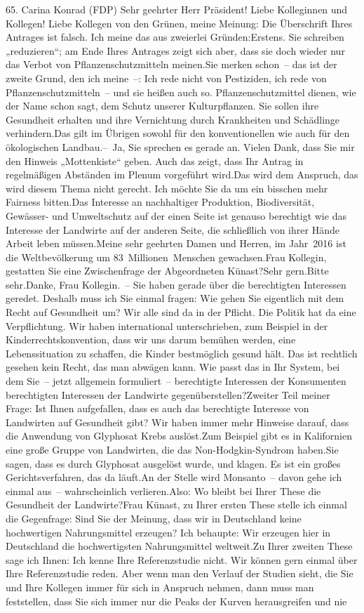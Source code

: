 \documentclass{article}
\begin{document}
	65. Carina Konrad (FDP) Sehr geehrter Herr Präsident! Liebe Kolleginnen und Kollegen! Liebe Kollegen von den Grünen, meine Meinung: Die Überschrift Ihres Antrages ist falsch. Ich meine das aus zweierlei Gründen:Erstens. Sie schreiben „reduzieren“; am Ende Ihres Antrages zeigt sich aber, dass sie doch wieder nur das Verbot von Pflanzenschutzmitteln meinen.Sie merken schon – das ist der zweite Grund, den ich meine –: Ich rede nicht von Pestiziden, ich rede von Pflanzenschutzmitteln – und sie heißen auch so. Pflanzenschutzmittel dienen, wie der Name schon sagt, dem Schutz unserer Kulturpflanzen. Sie sollen ihre Gesundheit erhalten und ihre Vernichtung durch Krankheiten und Schädlinge verhindern.Das gilt im Übrigen sowohl für den konventionellen wie auch für den ökologischen Landbau.– Ja, Sie sprechen es gerade an. Vielen Dank, dass Sie mir den Hinweis „Mottenkiste“ geben. Auch das zeigt, dass Ihr Antrag in regelmäßigen Abständen im Plenum vorgeführt wird.Das wird dem Anspruch, das wird diesem Thema nicht gerecht. Ich möchte Sie da um ein bisschen mehr Fairness bitten.Das Interesse an nachhaltiger Produktion, Biodiversität, Gewässer- und Umweltschutz auf der einen Seite ist genauso berechtigt wie das Interesse der Landwirte auf der anderen Seite, die schließlich von ihrer Hände Arbeit leben müssen.Meine sehr geehrten Damen und Herren, im Jahr 2016 ist die Weltbevölkerung um 83 Millionen Menschen gewachsen.Frau Kollegin, gestatten Sie eine Zwischenfrage der Abgeordneten Künast?Sehr gern.Bitte sehr.Danke, Frau Kollegin. – Sie haben gerade über die berechtigten Interessen geredet. Deshalb muss ich Sie einmal fragen: Wie gehen Sie eigentlich mit dem Recht auf Gesundheit um? Wir alle sind da in der Pflicht. Die Politik hat da eine Verpflichtung. Wir haben international unterschrieben, zum Beispiel in der Kinderrechtskonvention, dass wir uns darum bemühen werden, eine Lebenssituation zu schaffen, die Kinder bestmöglich gesund hält. Das ist rechtlich gesehen kein Recht, das man abwägen kann. Wie passt das in Ihr System, bei dem Sie – jetzt allgemein formuliert – berechtigte Interessen der Konsumenten berechtigten Interessen der Landwirte gegenüberstellen?Zweiter Teil meiner Frage: Ist Ihnen aufgefallen, dass es auch das berechtigte Interesse von Landwirten auf Gesundheit gibt? Wir haben immer mehr Hinweise darauf, dass die Anwendung von Glyphosat Krebs auslöst.Zum Beispiel gibt es in Kalifornien eine große Gruppe von Landwirten, die das Non-Hodgkin-Syndrom haben.Sie sagen, dass es durch Glyphosat ausgelöst wurde, und klagen. Es ist ein großes Gerichtsverfahren, das da läuft.An der Stelle wird Monsanto – davon gehe ich einmal aus – wahrscheinlich verlieren.Also: Wo bleibt bei Ihrer These die Gesundheit der Landwirte?Frau Künast, zu Ihrer ersten These stelle ich einmal die Gegenfrage: Sind Sie der Meinung, dass wir in Deutschland keine hochwertigen Nahrungsmittel erzeugen? Ich behaupte: Wir erzeugen hier in Deutschland die hochwertigsten Nahrungsmittel weltweit.Zu Ihrer zweiten These sage ich Ihnen: Ich kenne Ihre Referenzstudie nicht. Wir können gern einmal über Ihre Referenzstudie reden. Aber wenn man den Verlauf der Studien sieht, die Sie und Ihre Kollegen immer für sich in Anspruch nehmen, dann muss man feststellen, dass Sie sich immer nur die Peaks der Kurven herausgreifen und nie 
\end{document}
